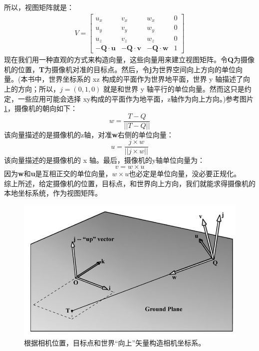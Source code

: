 \documentclass[11pt,a4paper,oldfontcommands]{memoir}
\begin{document}
{\begin{flushleft}
所以，视图矩阵就是：
\begin{align*}
V=\begin{bmatrix}
u_{x} & v_{x} & w_{x} & 0\\
u_{y} & v_{y} & w_{y} & 0\\
u_{z} & v_{z} & w_{z} & 0\\
\mathbf{-Q\cdot u} & \mathbf{-Q\cdot v} & \mathbf{-Q\cdot w} & 1
\end{bmatrix}
\end{align*}
现在我们用一种直观的方式来构造向量，这些向量用来建立视图矩阵。令\textbf{Q}为摄像机的位置，\textbf{T}为摄像机对准的目标点。然后，令\textbf{j}为世界空间向上方向的单位向量。(本书中，世界坐标系的 xz 构成的平面作为世界地平面，世界 y 轴描述了向上的方向；所以，$j=(0,1,0)$ 就是和世界 y 轴平行的单位向量。然而这只是约定，一些应用可能会选择 xy构成的平面作为地平面，z轴作为向上方向。)参考图片\ref{fig:5-20}，摄像机的朝向如下：
$$w=\frac{T-Q}{||T-Q||}$$
该向量描述的是摄像机的z轴，对准\textbf{w}右侧的单位向量：\\
$$u=\frac{j\times w}{||j \times w||}$$
该向量描述的是摄像机的 x 轴。最后，摄像机的y轴单位向量为：\\
$$v=w \times u$$
因为\textbf{w}和\textbf{u}是互相正交的单位向量，$w\times u$也必定是单位向量，没必要正规化。\\
综上所述，给定摄像机的位置，目标点，和世界向上方向，我们就能求得摄像机的本地坐标系统，作为视图矩阵。
\begin{figure}[t]
    \includegraphics[width=\textwidth]{5-20}
    \centering
    \caption{根据相机位置，目标点和世界“向上”矢量构造相机坐标系。}
    \label{fig:5-20}
\end{figure}


\end{flushleft}}
\end{document}
